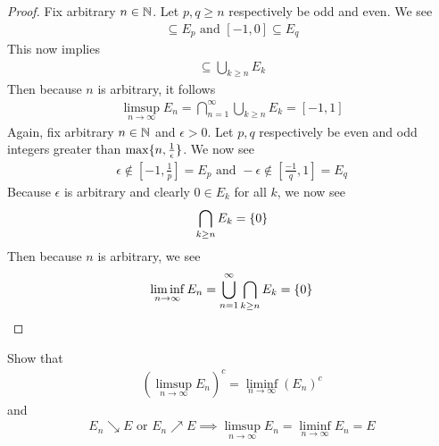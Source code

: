 \documentclass{report}
\begin{document}
\begin{proof}
Fix arbitrary $n\in\mathbb{N}$. Let $p,q\geq n$ respectively be odd and even. We see 
\begin{align*}
[0,1]\subseteq E_p \text{ and }[-1,0]\subseteq E_q
\end{align*}
This now implies 
\begin{align*}
[-1,1]\subseteq \bigcup_{k\geq n}E_k 
\end{align*}
Then because $n$ is arbitrary, it follows 
 \begin{align*}
\limsup_{n\to\infty} E_n=\bigcap_{n=1}^{\infty}\bigcup_{k\geq n} E_k = [-1,1]
\end{align*}
Again, fix arbitrary $n\in\mathbb{N}$ and $\epsilon >0$. Let $p,q$ respectively be even and odd integers greater than  $\max \{ n,\frac{1}{\epsilon } \}$. We now see 
\begin{align*}
\epsilon \not\in[-1 , \frac{1}{p}]=E_p\text{ and }-\epsilon  \not\in  [\frac{-1}{q},1]=E_q
\end{align*}
Because $\epsilon $ is arbitrary and clearly $0 \in E_k$  for all $k$,  we now see 
\begin{align*}
\bigcap_{k\geq n} E_k= \{ 0 \}
\end{align*}
Then because $n$ is arbitrary, we see 
\begin{align*}
\liminf_{n\to\infty} E_n = \bigcup_{n=1}^{\infty}\bigcap_{k\geq n}E_k=\{ 0 \}
\end{align*}


\end{proof}
\begin{question}{}{}
Show that 
\begin{align*}
  (\limsup_{n\to\infty} E_n)^c =\liminf_{n\to\infty} (E_n)^c
\end{align*}
and 
\begin{align*}
E_n\searrow E\text{ or }E_n\nearrow E \implies \limsup_{n\to\infty} E_n=\liminf_{n\to\infty} E_n=E
\end{align*}
\end{question}
\end{document}
